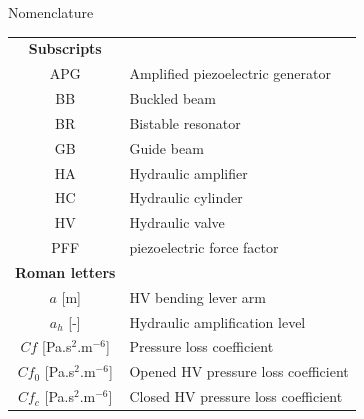 \documentclass[3p,twocolumn,preprint]{elsarticle}
\begin{document}
\begin{table}
\begin{large}
	\begin{center}
		Nomenclature	\\
		\noindent\makebox[\linewidth]{\rule{\textwidth}{0.4pt}}
	\end{center}
\end{large}		
\begin{minipage}{.5\textwidth}
	\begin{tabular}{ c  m{6cm} }
		\textbf{Subscripts}      &                                                         \\
		APG                      & Amplified piezoelectric generator                       \\
		BB                       & Buckled beam                                           \\
		BR                       & Bistable resonator                                      \\
		GB                       & Guide beam                                             \\
		HA                       & Hydraulic amplifier                                     \\
		HC                       & Hydraulic cylinder                                      \\
		HV                       & Hydraulic valve                                         \\
		PFF						 & piezoelectric force factor  \\
		\textbf{Roman letters}   &                                                         \\
		$a$ [m]                  & HV bending lever arm                                    \\
		$a_h$ [-]                & Hydraulic amplification level                           \\
		$Cf$ [Pa.s$^2$.m$^{-6}$]         & Pressure loss coefficient                               \\
		$Cf_0$ [Pa.s$^2$.m$^{-6}$]       & Opened HV pressure loss coefficient                     \\
		$Cf_c$ [Pa.s$^2$.m$^{-6}$]       & Closed HV pressure loss coefficient                     \\

\end{tabular}
\end{minipage}
\end{table}
\end{document}
